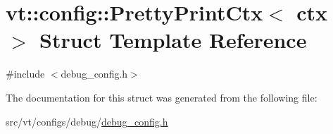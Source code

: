 \hypertarget{structvt_1_1config_1_1_pretty_print_ctx}{}\section{vt\+:\+:config\+:\+:Pretty\+Print\+Ctx$<$ ctx $>$ Struct Template Reference}
\label{structvt_1_1config_1_1_pretty_print_ctx}


{\ttfamily \#include $<$debug\+\_\+config.\+h$>$}



The documentation for this struct was generated from the following file\+:\begin{DoxyCompactItemize}
\item 
src/vt/configs/debug/\hyperlink{debug__config_8h}{debug\+\_\+config.\+h}\end{DoxyCompactItemize}
